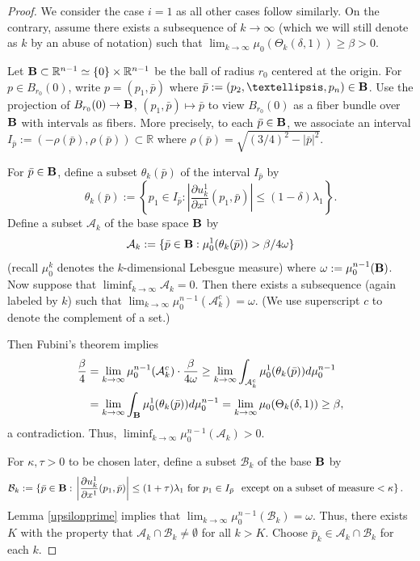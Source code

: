 \documentclass[12pt]{amsart}
\theoremstyle{definition}
\numberwithin{equation}{section}
\newcommand{\R}{\mathbb R}
\begin{document}
\begin{proof} 
We consider the case $i=1$ as all other cases follow similarly.    On the contrary, assume there exists a subsequence of $k \rightarrow \infty$ (which we will still denote as $k$ by an abuse of notation) such that $\lim_{k \to \infty}\mu_0(\Theta_k(\delta, 1)) \geq \beta >0$.


Let ${\bf B} \subset \R^{n-1}\simeq \{0\} \times \R^{n-1}$ be the ball of radius $r_0$ centered at the origin. For $p \in B_{r_0}(0)$, write $p = (p_1, \bar p)$ where $\bar p:= (p_2, \dots, p_n) \in {\bf B}$. 
Use the projection of $B_{r_0}(0) \rightarrow {\bf B}$, $(p_1,\bar p) \mapsto \bar p$ to view $B_{r_0}(0)$ as a fiber bundle over ${\bf B}$ with intervals as fibers.  
More precisely,  to each $\bar p \in {\bf B}$, we associate an interval  $I_{\bar p}:=(-\rho(\bar p), \rho(\bar p)) \subset \R$  where $\rho(\bar p)=\sqrt{(3/4)^2 - |\bar p|^2}$. 


For $\bar p \in {\bf B}$, define a subset $\theta_k(\bar p)$ of the interval $I_{\bar p}$ by 
\[
\theta_k(\bar p):= \left\{p_1 \in I_{\bar p}:  \left| \frac{\partial u^1_k}{\partial x^1} (p_1,\bar p) \right|\leq (1-\delta)\lambda_1\right\}.
\]
 Define a subset   $\mathcal A_k$ of the base space ${\bf B}$ by 
$$\mathcal A_k:= \{\bar p \in {\bf B}: \mu_0^1(\theta_k(\bar p))> \beta/4\omega\}
$$ (recall  $\mu_0^k$ denotes the $k$-dimensional Lebesgue measure) where $\omega:=\mu_0^{n-1}({\bf B})$. 
Now suppose that $\liminf_{k \to \infty} \mathcal A_k =0$. Then there exists a subsequence (again labeled by $k$) such that 
 $\lim_{k \to \infty}\mu_0^{n-1}(\mathcal A_k^c) =\omega$. (We use superscript $c$ to denote the complement of a set.)
 
 Then Fubini's theorem implies
\begin{align*}
\frac{\beta}{4} &= \lim_{k \to \infty}\mu_0^{n-1}(\mathcal A_k^c) \cdot \frac{\beta}{4\omega} \geq \lim_{k \to \infty} \int_{\mathcal A_k^c} \mu_0^1(\theta_k(\bar p)) d\mu_0^{n-1}\\& =\lim_{k \to \infty} \int_{{\bf B}}\mu_0^1(\theta_k(\bar p)) d\mu_0^{n-1}= \lim_{k \to \infty}\mu_0(\Theta_k(\delta, 1)) \geq \beta,
\end{align*}
a contradiction.  Thus, $\liminf_{k \to \infty}\mu_0^{n-1}(\mathcal A_k) >0$. 

For $\kappa, \tau>0$ to be chosen later, define a subset $\mathcal B_k$ of the base ${\bf B}$ by
\begin{align*}
\mathcal B_k:= \left\{ \bar p \in {\bf B}:\right.& \left.\left| \frac{\partial u^1_k}{\partial x^1} (p_1, \bar p) \right|\leq (1+\tau) \lambda_1 \text{ for } p_1 \in I_{\bar p}\right.\left.  \text{ except on a subset of measure}< \kappa \right\}.
\end{align*} 
Lemma \ref{upsilonprime} implies that $\lim_{k \to \infty}\mu_0^{n-1}(\mathcal B_k) = \omega$. Thus,  there exists $K$  with the property that $\mathcal A_k \cap \mathcal B_k \neq \emptyset$ for all $k> K$.  Choose $\bar p_k \in \mathcal A_k \cap \mathcal B_k$ for each $k$.


\end{proof}
\end{document}
